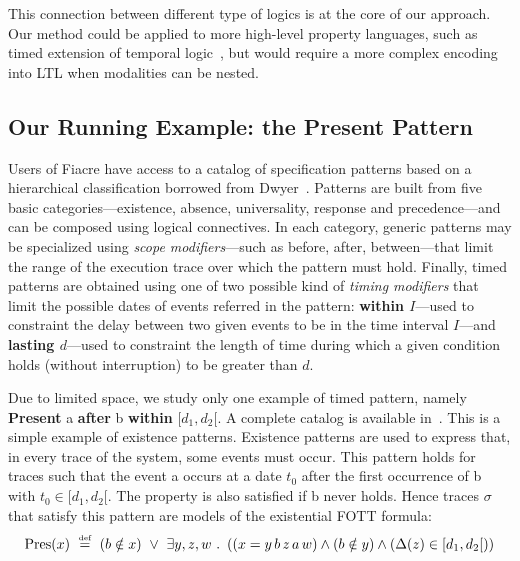 \documentclass[a4paper]{scrartcl}
\def\code#1{\textsf{\small\bfseries #1}}
\def\vars#1{\textsf{\small #1}}
\def\such{\ .\ }
\newcommand{\eqdef}{\ensuremath{\overset{\text{\tiny def}}{=}}}
\begin{document}
This connection between different type of logics is at the core of our
approach. Our method could be applied to more high-level property
languages, such as timed extension of temporal logic~\cite{SRPMTL},
but would require a more complex encoding into LTL when modalities can
be nested.



\subsection{Our Running Example: the Present Pattern}
Users of Fiacre have access to a catalog of specification patterns
based on a hierarchical classification borrowed from
Dwyer~\cite{ksu}. Patterns are built from five basic
categories---existence, absence, universality, response and
precedence---and can be composed using logical connectives.  In each
category, generic patterns may be specialized using \emph{scope
  modifiers}---such as before, after, between---that limit the range
of the execution trace over which the pattern must hold. Finally,
timed patterns are obtained using one of two possible kind of
\emph{timing modifiers} that limit the possible dates of events
referred in the pattern: \textbf{within $I$}---used to constraint the
delay between two given events to be in the time interval $I$---and
\textbf{lasting $d$}---used to constraint the length of time during
which a given condition holds (without interruption) to be greater
than $d$. 

Due to limited space, we study only one example of timed pattern,
namely {\code{Present} \vars{a} \code{after} \vars{b} \code{within}
  $[d_1, d_2[$}. A complete catalog is available in~\cite{FRP11}.
This is a simple example of {existence} patterns. Existence patterns
are used to express that, in every trace of the system, some events
must occur.  This pattern holds for traces such that the event
\vars{a} occurs at a date $t_0$ after the first occurrence of \vars{b}
with $t_0 \in [d_1, d_2[$. The property is also satisfied if \vars{b}
never holds. Hence traces $\sigma$ that satisfy this pattern are
models of the existential FOTT formula:
\[
\mathrm{Pres}(x) \ \eqdef\ (b \notin x) \ \vee\ \exists y, z, w \such
\left ( (x = y \, b \, z \, a\, w) \wedge (b \notin y) \wedge
  (\Delta(z) \in [d_1, d_2[) \right ) \]


\end{document}
